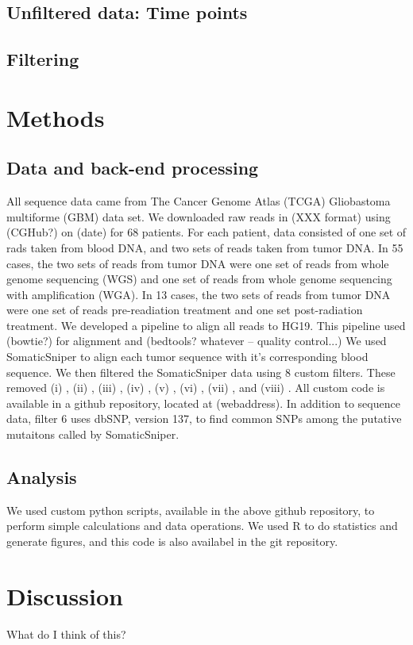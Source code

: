 \documentclass[11pt]{article} %
\begin{document}
\subsection{Unfiltered data: Time points}

\subsection{Filtering}

\section{Methods}

\subsection{Data and back-end processing}

All sequence data came from The Cancer Genome Atlas (TCGA) Gliobastoma multiforme (GBM) data set. We downloaded raw reads in (XXX format) using (CGHub?) on (date) for 68 patients. For each patient, data consisted of one set of rads taken from blood DNA, and two sets of reads taken from tumor DNA. In 55 cases, the two sets of reads from tumor DNA were one set of reads from whole genome sequencing (WGS) and one set of reads from whole genome sequencing with amplification (WGA). In 13 cases, the two sets of reads from tumor DNA were one set of reads pre-readiation treatment and one set post-radiation treatment. We developed a pipeline to align all reads to HG19. This pipeline used (bowtie?) for alignment and (bedtools? whatever -- quality control...) We used SomaticSniper to align each tumor sequence with it's corresponding blood sequence. We then filtered the SomaticSniper data using 8 custom filters. These removed (i) , (ii) , (iii) , (iv) , (v) , (vi) , (vii) , and (viii) . All custom code is available in a github repository, located at (webaddress). In addition to sequence data, filter 6 uses dbSNP, version 137, to find common SNPs among the putative mutaitons called by SomaticSniper.

\subsection{Analysis}

We used custom python scripts, available in the above github repository, to perform simple calculations and data operations. We used R to do statistics and generate figures, and this code is also availabel in the git repository.  

\section{Discussion}

What do I think of this?
\end{document}
